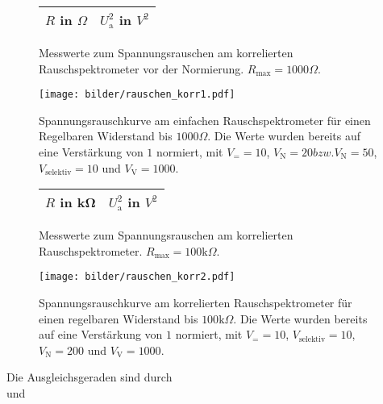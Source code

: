 	\begin{figure}[htbp]
	\begin{minipage}{0.3\textwidth}
			\centering
			\begin{tabular}{cc}
				\toprule \midrule
				$R$ in $\Omega$ & $U_\text{a}^2$ in $V^2$ \\
				\midrule
				
				\midrule \bottomrule
			\end{tabular}
			\caption{Messwerte zum Spannungsrauschen am korrelierten
			Rauschspektrometer vor der Normierung. $R_\text{max}=1000 \Omega$.}
			\label{tab:rauschen_korr1}
	\end{minipage}
	\hfill
	\begin{minipage}{0.6\textwidth}
			\centering
			\texttt{[image: bilder/rauschen\_korr1.pdf]}
			\caption{Spannungsrauschkurve am einfachen Rauschspektrometer für einen
			Regelbaren Widerstand bis $1000\Omega$. Die Werte wurden bereits auf eine Verstärkung von
			$1$ normiert, mit $V_= =10$, $V_\text{N}=20 bzw. V_\text{N}=50$,
			$V_\text{selektiv}=10$ und $V_\text{V}=1000$. }
			\label{fig:rauschen_korr1}
	\end{minipage}
	\end{figure}


    \begin{figure}[htbp]
	\begin{minipage}{0.3\textwidth}
			\centering
			\begin{tabular}{cc}
				\toprule \midrule
				$R$ in \si{\kilo\ohm} & $U_\text{a}^2$ in $V^2$ \\
				\midrule
				
				\midrule \bottomrule
			\end{tabular}
			\caption{Messwerte zum Spannungsrauschen am korrelierten
			Rauschspektrometer. $R_\text{max}=100 \text{k}\Omega$.}
			\label{tab:rauschen_korr2}
	\end{minipage}
	\hfill
	\begin{minipage}{0.6\textwidth}
			\centering
			\texttt{[image: bilder/rauschen\_korr2.pdf]}
			\caption{Spannungsrauschkurve am korrelierten Rauschspektrometer für einen
			regelbaren Widerstand bis $100\text{k}\Omega$. Die Werte wurden bereits auf eine
			Verstärkung von 	$1$ normiert, mit $V_= =10$, $V_\text{selektiv}=10$, $V_\text{N}=200$ und
			$V_\text{V}=1000$. }
			\label{fig:rauschen_korr2}
	\end{minipage}
	\end{figure}
		Die Ausgleichsgeraden sind durch
		\begin{equation}
			
		\end{equation}
		und
		\begin{equation}
			
		\end{equation}

